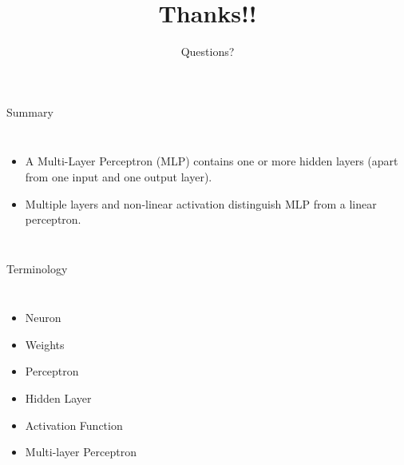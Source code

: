 \documentclass[aspectratio=169,13pt,usenames,dvipsnames]{beamer}
\begin{document}
\begin{frame}{ Summary }
\begin{columns}
\begin{itemize}
  \item A Multi-Layer Perceptron (MLP) contains one or more hidden layers (apart from one input and one output layer).
  \item Multiple layers and non-linear activation distinguish MLP from a linear perceptron.
\end{itemize}
\end{columns}
\end{frame}

\begin{frame}{ Terminology }
\begin{columns}
\begin{itemize}
  \item Neuron
  \item Weights
  \item Perceptron
  \item Hidden Layer
  \item Activation Function
  \item Multi-layer Perceptron
\end{itemize}
\end{columns}
\end{frame}



{ \1
\begin{frame}
	\title{Thanks!!}
	\subtitle{Questions?}
	\maketitle
\end{frame}
}
\end{document}

